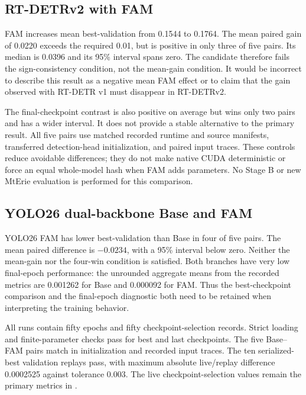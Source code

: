 \subsection{RT-DETRv2 with FAM}

FAM increases mean best-validation \mapfifty{} from 0.1544 to 0.1764.
The mean paired gain of 0.0220 exceeds the required 0.01, but is positive in
only three of five pairs. Its median is 0.0396 and its 95\% interval spans
zero. The candidate therefore fails the sign-consistency condition, not the
mean-gain condition. It would be incorrect to describe this result as a
negative mean FAM effect or to claim that the gain observed with RT-DETR v1
must disappear in RT-DETRv2.

The final-checkpoint contrast is also positive on average but wins only two
pairs and has a wider interval. It does not provide a stable alternative to
the primary result. All five pairs use matched recorded runtime and source
manifests, transferred detection-head initialization, and paired input traces.
These controls reduce avoidable differences; they do not make native CUDA
deterministic or force an equal whole-model hash when FAM adds parameters.
No Stage B or new MtErie evaluation is performed for this comparison.

\subsection{YOLO26 dual-backbone Base and FAM}

YOLO26 FAM has lower best-validation \mapfifty{} than Base in four of
five pairs. The mean paired difference is \(-0.0234\), with a 95\% interval
below zero. Neither the mean-gain nor the four-win condition is satisfied.
Both branches have very low final-epoch performance: the unrounded aggregate
means from the recorded metrics are 0.001262 for Base and 0.000092 for
FAM. Thus the best-checkpoint comparison and the final-epoch diagnostic both
need to be retained when interpreting the training behavior.

All runs contain fifty epochs and fifty checkpoint-selection records.
Strict loading and finite-parameter checks pass for best and last checkpoints.
The five Base--FAM pairs match in initialization and recorded input traces.
The ten serialized-best validation replays pass, with maximum absolute
live/replay difference 0.0002525 against tolerance 0.003. The live
checkpoint-selection values remain the primary metrics in
.


